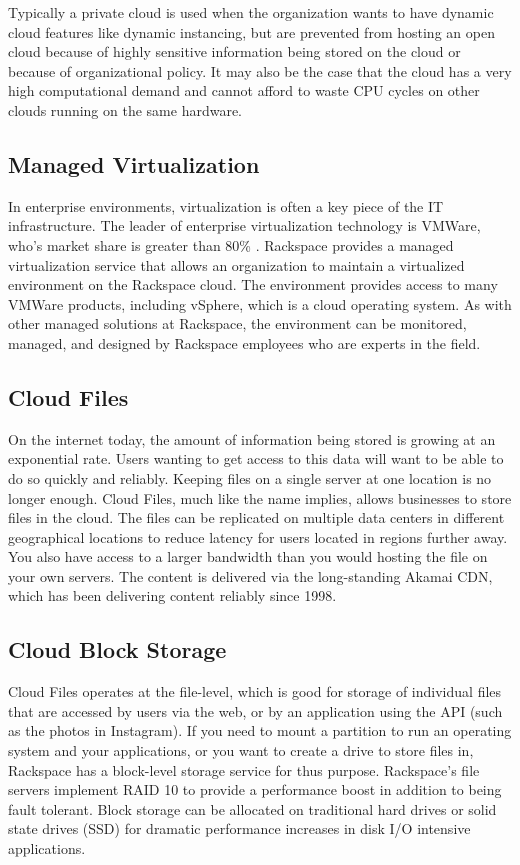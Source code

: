 \documentclass[DIV=calc, paper=letter, fontsize=12pt, twocolumn]{scrartcl}	 %
\begin{document}
Typically a private cloud is used when the organization wants to have dynamic
cloud features like dynamic instancing, but are prevented from hosting an open
cloud because of highly sensitive information being stored on the cloud or
because of organizational policy. It may also be the case that the cloud has
a very high computational demand and cannot afford to waste CPU cycles on
other clouds running on the same hardware.

\subsection*{Managed Virtualization}

In enterprise environments, virtualization is often a key piece of the IT
infrastructure. The leader of enterprise virtualization technology is 
VMWare, who's market share is greater than 80\% \cite{ref:vmware}. Rackspace
provides a managed virtualization service that allows an organization to
maintain a virtualized environment on the Rackspace cloud. The environment 
provides access to many VMWare products, including vSphere, which is a
cloud operating system. As with other managed solutions at Rackspace, 
the environment can be monitored, managed, and designed by Rackspace 
employees who are experts in the field.

\subsection*{Cloud Files}

On the internet today, the amount of information being stored is growing
at an exponential rate. Users wanting to get access to this data will
want to be able to do so quickly and reliably. Keeping files on a single
server at one location is no longer enough. Cloud Files, much like the
name implies, allows businesses to store files in the cloud. The files
can be replicated on multiple data centers in different geographical
locations to reduce latency for users located in regions further away.
You also have access to a larger bandwidth than you would hosting
the file on your own servers. The content is delivered via the long-standing
Akamai CDN, which has been delivering content reliably since 1998.

\subsection*{Cloud Block Storage}

Cloud Files operates at the file-level, which is good for storage of
individual files that are accessed by users via the web, or by an
application using the API (such as the photos in Instagram). If you need to
mount a partition to run an operating system and your applications, 
or you want to create a drive to store files in, Rackspace has a block-level
storage service for thus purpose. Rackspace's file servers implement RAID
10 to provide a performance boost in addition to being fault tolerant.
Block storage can be allocated on traditional hard drives or solid state
drives (SSD) for dramatic performance increases in disk I/O intensive
applications.
\end{document}
